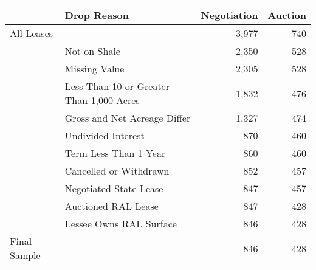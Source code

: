 
\begin{tabular}{llrr}
\toprule
 & Drop Reason & Negotiation & Auction\\
\midrule
All Leases &  & 3,977 & 740\\
 & Not on Shale & 2,350 & 528\\
 & Missing Value & 2,305 & 528\\
 & Less Than 10 or Greater Than 1,000 Acres & 1,832 & 476\\
 & Gross and Net Acreage Differ & 1,327 & 474\\
 & Undivided Interest & 870 & 460\\
 & Term Less Than 1 Year & 860 & 460\\
 & Cancelled or Withdrawn & 852 & 457\\
 & Negotiated State Lease & 847 & 457\\
 & Auctioned RAL Lease & 847 & 428\\
 & Lessee Owns RAL Surface & 846 & 428\\
Final Sample &  & 846 & 428\\
\bottomrule
\end{tabular}
